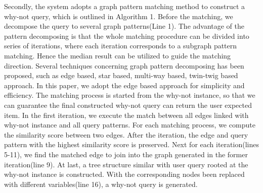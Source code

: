 \documentclass{article}
\begin{document}
Secondly, the system adopts a graph pattern matching method to construct a why-not query, which is outlined in Algorithm 1. Before the matching, we decompose the query to several graph patterns(Line 1). The advantage of the pattern decomposing is that the whole matching procedure can be divided into series of iterations, where each iteration corresponds to a subgraph pattern matching. Hence the median result can be utilized to guide the matching direction. Several techniques concerning graph pattern decomposing has been proposed, such as edge based, star based, multi-way based, twin-twig based approach. In this paper, we adopt the edge based approach for simplicity and efficiency. The matching process is started from the why-not instance, so that we can guarantee the final constructed why-not query can return the user expected item. In the first iteration, we execute the match between all edges linked with why-not instance and all query patterns. For each matching process, we compute the similarity score between two edges. After the iteration, the edge and query pattern with the highest similarity score is preserved. Next for each iteration(lines 5-11), we find the matched edge to join into the graph generated in the former iteration(line 9). At last, a tree structure similar with user query rooted at the why-not instance is constructed. With the corresponding nodes been replaced with different variables(line 16), a why-not query is generated.
\end{document}
